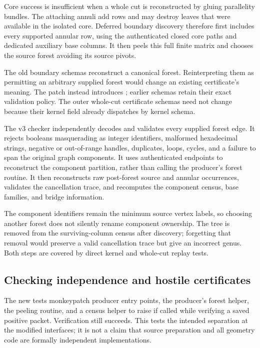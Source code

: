 Core success is insufficient when a whole cut is reconstructed by gluing
parallelity bundles.  The attaching annuli add rows and may destroy
leaves that were available in the isolated core.  Deferred boundary
discovery therefore first includes every supported annular row, using
the authenticated closed core paths and dedicated auxiliary base
columns.  It then peels this full finite matrix and chooses the source
forest avoiding its source pivots.

The old boundary schemas reconstruct a canonical forest.  Reinterpreting
them as permitting an arbitrary supplied forest would change an existing
certificate's meaning.  The patch instead introduces
; earlier schemas retain their exact
validation policy.  The outer whole-cut certificate schemas need not
change because their kernel field already dispatches by kernel schema.

The v3 checker independently decodes and validates every supplied forest
edge.  It rejects booleans masquerading as integer identifiers, malformed
hexadecimal strings, negative or out-of-range handles, duplicates, loops,
cycles, and a failure to span the original graph components.  It uses
authenticated endpoints to reconstruct the component partition, rather
than calling the producer's forest routine.  It then reconstructs raw
post-forest source and annular occurrences, validates the cancellation
trace, and recomputes the component census, base families, and bridge
information.

The component identifiers remain the minimum source vertex labels, so
choosing another forest does not silently rename component ownership.
The tree is removed from the surviving-column census after discovery;
forgetting that removal would preserve a valid cancellation trace but
give an incorrect genus.  Both steps are covered by direct kernel and
whole-cut replay tests.

\subsection{Checking independence and hostile certificates}

The new tests monkeypatch producer entry points, the producer's forest
helper, the peeling routine, and a census helper to raise if called while
verifying a saved positive packet.  Verification still succeeds.  This
tests the intended separation at the modified interfaces; it is not a
claim that source preparation and all geometry code are formally
independent implementations.

